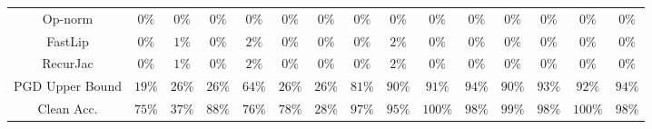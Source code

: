 \begin{table*}
{\begin{tabular}{c|c|c|c|c|c|c|c|c|c|c|c|c|c|c}
      Op-norm &         $0\%$ &         $0\%$ &         $0\%$ &         $0\%$ &         $0\%$ &         $0\%$ &         $0\%$ &         $0\%$ &         $0\%$ &         $0\%$ &         $0\%$ &         $0\%$ &         $0\%$ &         $0\%$ \\
      FastLip &         $0\%$ &         $1\%$ &         $0\%$ &         $2\%$ &         $0\%$ &         $0\%$ &         $0\%$ &         $2\%$ &         $0\%$ &         $0\%$ &         $0\%$ &         $0\%$ &         $0\%$ &         $0\%$ \\
     RecurJac &         $0\%$ &         $1\%$ &         $0\%$ &         $2\%$ &         $0\%$ &         $0\%$ &         $0\%$ &         $2\%$ &         $0\%$ &         $0\%$ &         $0\%$ &         $0\%$ &         $0\%$ &         $0\%$ \\
\hline
PGD Upper Bound &        $19\%$ &        $26\%$ &        $26\%$ &        $64\%$ &        $26\%$ &        $26\%$ &        $81\%$ &        $90\%$ &        $91\%$ &        $94\%$ &        $90\%$ &        $93\%$ &        $92\%$ &        $94\%$ \\
\hline
   Clean Acc. &        $75\%$ &        $37\%$ &        $88\%$ &        $76\%$ &        $78\%$ &        $28\%$ &        $97\%$ &        $95\%$ &       $100\%$ &        $98\%$ &        $99\%$ &        $98\%$ &       $100\%$ &        $98\%$ \\
\bottomrule

    \end{tabular}
    }
    \label{tab:exp-A-mnist-verify-robust-acc}
\end{table*}

